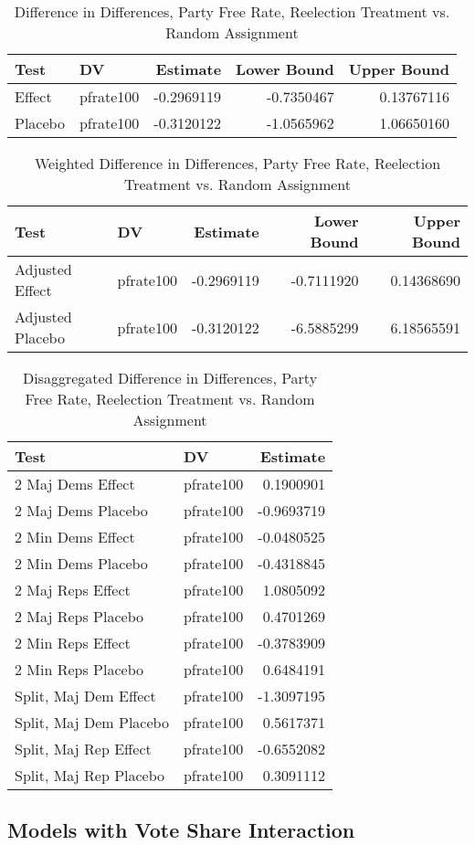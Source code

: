 \documentclass[12pt]{article}
\begin{document}
\begin{table}[H]
	\centering
	\caption{Difference in Differences, Party Free Rate, Reelection Treatment vs. Random Assignment}
	\begin{tabular}{llrrr}
		\hline
		Test & DV & Estimate & Lower Bound & Upper Bound \\ 
		\hline
		Effect & pfrate100 & -0.2969119 & -0.7350467 & 0.13767116 \\ 
		Placebo & pfrate100 & -0.3120122 & -1.0565962 & 1.06650160 \\  
		\hline
	\end{tabular}
\end{table}

\begin{table}[H]
	\centering
	\caption{Weighted Difference in Differences, Party Free Rate, Reelection Treatment vs. Random Assignment}
	\begin{tabular}{llrrr}
		\hline
		Test & DV & Estimate & Lower Bound & Upper Bound \\ 
		\hline
		Adjusted Effect & pfrate100 & -0.2969119 & -0.7111920 & 0.14368690 \\ 
		Adjusted Placebo & pfrate100 & -0.3120122 & -6.5885299 & 6.18565591 \\  
		\hline
	\end{tabular}
\end{table}

\begin{table}[H]
	\centering
	\caption{Disaggregated Difference in Differences, Party Free Rate, Reelection Treatment vs. Random Assignment}
	\begin{tabular}{llr}
		\hline
		Test & DV & Estimate \\  
		\hline
		2 Maj Dems Effect & pfrate100 & 0.1900901 \\ 
		2 Maj Dems Placebo & pfrate100 & -0.9693719 \\ 
		2 Min Dems Effect & pfrate100 & -0.0480525 \\ 
		2 Min Dems Placebo & pfrate100 & -0.4318845 \\ 
		2 Maj Reps Effect & pfrate100 & 1.0805092 \\ 
		2 Maj Reps Placebo & pfrate100 & 0.4701269 \\ 
		2 Min Reps Effect & pfrate100 & -0.3783909 \\ 
		2 Min Reps Placebo & pfrate100 & 0.6484191 \\ 
		Split, Maj Dem Effect & pfrate100 & -1.3097195 \\ 
		Split, Maj Dem Placebo & pfrate100 & 0.5617371 \\ 
		Split, Maj Rep Effect & pfrate100 & -0.6552082 \\ 
		Split, Maj Rep Placebo & pfrate100 & 0.3091112 \\ 
		\hline
	\end{tabular}
\end{table}

\subsection{Models with Vote Share Interaction}
\end{document}
